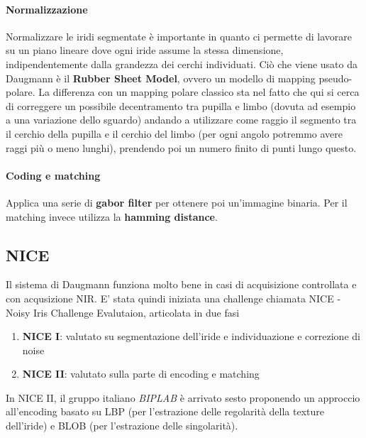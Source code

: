 \documentclass{article}
\begin{document}
\paragraph{Normalizzazione}
Normalizzare le iridi segmentate è importante in quanto ci permette di lavorare su un piano lineare dove ogni iride assume la stessa dimensione, indipendentemente dalla grandezza dei cerchi individuati.
Ciò che viene usato da Daugmann è il \textbf{Rubber Sheet Model}, ovvero un modello di mapping pseudo-polare. La differenza con un mapping polare classico sta nel fatto che qui si cerca di correggere un possibile decentramento tra pupilla e limbo (dovuta ad esempio a una variazione dello sguardo) andando a utilizzare come raggio il segmento tra il cerchio della pupilla e il cerchio del limbo (per ogni angolo potremmo avere raggi più o meno lunghi), prendendo poi un numero finito di punti lungo questo.

\paragraph{Coding e matching}
Applica una serie di \textbf{gabor filter} per ottenere poi un'immagine binaria. Per il matching invece utilizza la \textbf{hamming distance}.


\subsection{NICE}
Il sistema di Daugmann funziona molto bene in casi di acquisizione controllata e con acqusizione NIR. E' stata quindi iniziata una challenge chiamata NICE - Noisy Iris Challenge Evalutaion, articolata in due fasi
\begin{enumerate}
    \item \textbf{ NICE I}: valutato su segmentazione dell'iride e individuazione e correzione di noise
    \item \textbf{NICE II}: valutato sulla parte di encoding e matching
\end{enumerate}

In NICE II, il gruppo italiano \textit{BIPLAB} è arrivato sesto proponendo un approccio all'encoding basato su LBP (per l'estrazione delle regolarità della texture dell'iride) e BLOB (per l'estrazione delle singolarità).
\end{document}
